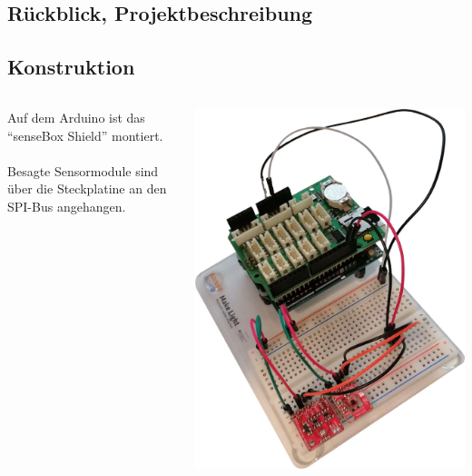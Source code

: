 \documentclass[ngerman]{schoolPres}
\begin{document}
  \hypertarget{sec:project}{}
  \subsection{Rückblick, Projektbeschreibung}%

  \subsection{Konstruktion}%
  \begin{frame}
    \begin{columns}[c]
      \begin{column}{.5\linewidth}
        Auf dem Arduino ist das \enquote{senseBox Shield} montiert.
        \\~\\

        Besagte Sensormodule sind über die Steckplatine an den SPI-Bus angehangen.
      \end{column}
      \begin{column}{.5\linewidth}
        \centering
        \includegraphics[height=.8\textheight]{media/board.jpg}
      \end{column}
    \end{columns}


\end{frame}
\end{document}

